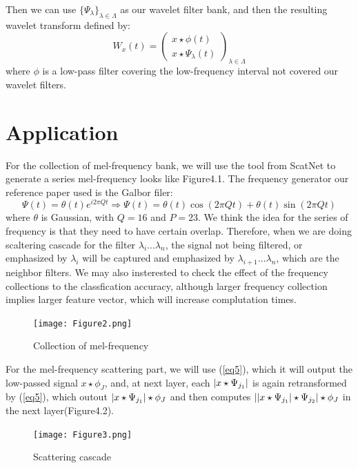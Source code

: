 \documentclass[final]{siamltexmm}
\begin{document}
Then we can use $\{ \Psi_{\lambda}\}_{\lambda \in \Lambda}$ as our wavelet filter bank, and then the resulting wavelet transform defined by:
\begin{equation}
W_{x}(t)=\left( \begin{array}{cc}
x \star \phi(t) \\
x \star \Psi_{\lambda}(t)
\end{array} \right)_{\lambda \in \Lambda}\label{eq5}
\end{equation}
where $\phi$ is a low-pass filter covering the low-frequency interval not covered our wavelet filters.

\section{Application}
For the collection of mel-frequency bank, we will use the tool from ScatNet to generate a series mel-frequency looks like Figure4.1.  The frequency generator our reference paper used is the Galbor filer:
\begin{equation}
\Psi(t)=\theta(t)e^{i2\pi Qt} \Rightarrow \Psi(t)=\theta(t)\cos(2\pi Qt) + \theta(t)\sin(2\pi Qt)\label{eq6}
\end{equation}
where $\theta$ is Gaussian, with $Q=16$ and $P=23$.  We think the idea for the series of frequency is that they need to have certain overlap. Therefore, when we are doing scaltering cascade for the filter $\lambda_{i} \dots \lambda_{n}$,  the signal not being filtered, or emphasized by $\lambda_{i}$ will be captured and emphasized by $\lambda_{i+1} \dots \lambda_{n}$, which are the neighbor filters. We may also insterested to check the effect of the frequency collections to the classfication accuracy, although larger frequency collection implies larger feature vector, which will increase complutation times.
\begin{figure}[ht]
\begin{center}
  \texttt{[image: Figure2.png]}
  \caption{Collection of mel-frequency}
\end{center}
\end{figure}
For the mel-frequency scattering part, we will use (\ref{eq5}), which it will output the low-passed signal $x \star \phi_{J}$, and, at next layer, each $\arrowvert x \star \Psi_{j_{1}} \arrowvert$ is again retransformed by (\ref{eq5}), which outout $\arrowvert x \star \Psi_{j_{1}} \arrowvert \star \phi_{J}$ and then computes $\arrowvert \arrowvert x \star \Psi_{j_{1}} \arrowvert \star \Psi_{j_{2}} \arrowvert \star \phi_{J}$ in the next layer(Figure4.2).
\begin{figure}[ht]
\begin{center}
  \texttt{[image: Figure3.png]}
  \caption{Scattering cascade}
\end{center}
\end{figure}
\end{document}
